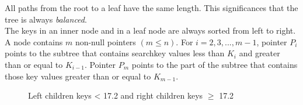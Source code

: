 \documentclass[abstracton,12pt]{scrreprt}
\begin{document}
All paths from the root to a leaf have the same length. This significances that the tree is always \emph{balanced}.\\
The keys in an inner node and in a leaf node are always sorted from left to right. A node contains $m$ non-null pointers $\left(m \leq n\right)$. For $i = 2, 3, . . . ,m-1$, pointer $P_i$ points to the subtree that contains searchkey values less than $K_i$ and greater than or equal to $K_{i-1}$. Pointer $P_m$ points to the part of the subtree that contains those key values greater than or equal to $K_{m-1}$. 
\begin{figure}[ht!]
	\centering
	\vspace{2mm}
	\caption{Left children keys < 17.2 and right children keys $\geq$ 17.2}
	\label{fig:BTreeBook}
\end{figure} 
\end{document}
